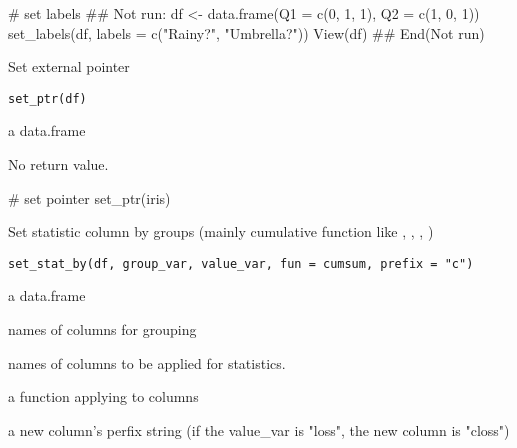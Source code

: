 \documentclass[letterpaper]{book}
\begin{document}
%
\begin{Examples}
\begin{ExampleCode}
# set labels
## Not run: df <- data.frame(Q1 = c(0, 1, 1), Q2 = c(1, 0, 1))
set_labels(df, labels = c("Rainy?", "Umbrella?"))
View(df)
## End(Not run)

\end{ExampleCode}
\end{Examples}
%
\begin{Description}
Set external pointer
\end{Description}
%
\begin{Usage}
\begin{verbatim}
set_ptr(df)
\end{verbatim}
\end{Usage}
%
\begin{Arguments}
\begin{ldescription}
\item[\code{df}] a data.frame
\end{ldescription}
\end{Arguments}
%
\begin{Value}
No return value.
\end{Value}
%
\begin{Examples}
\begin{ExampleCode}
# set pointer
set_ptr(iris)

\end{ExampleCode}
\end{Examples}
%
\begin{Description}
Set statistic column by groups (mainly cumulative function like , , , )
\end{Description}
%
\begin{Usage}
\begin{verbatim}
set_stat_by(df, group_var, value_var, fun = cumsum, prefix = "c")
\end{verbatim}
\end{Usage}
%
\begin{Arguments}
\begin{ldescription}
\item[\code{df}] a data.frame

\item[\code{group\_var}] names of columns for grouping

\item[\code{value\_var}] names of columns to be applied for statistics.

\item[\code{fun}] a function applying to columns

\item[\code{prefix}] a new column's perfix string (if the value\_var is "loss", the new column is "closs")
\end{ldescription}
\end{Arguments}
\end{document}
